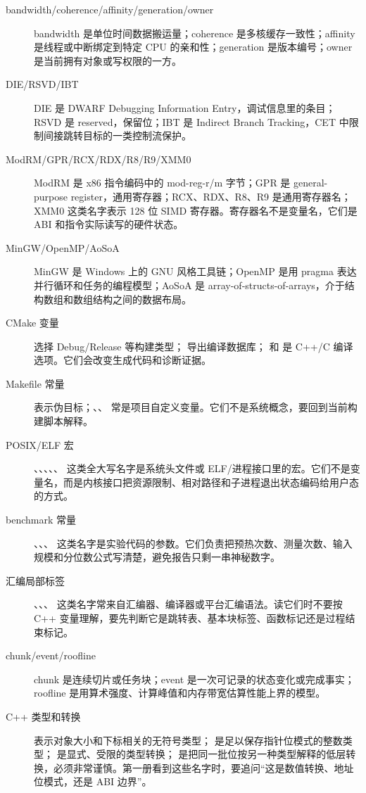 \begin{description}
  \item[bandwidth/coherence/affinity/generation/owner] bandwidth 是单位时间数据搬运量；coherence 是多核缓存一致性；affinity 是线程或中断绑定到特定 CPU 的亲和性；generation 是版本编号；owner 是当前拥有对象或写权限的一方。
  \item[DIE/RSVD/IBT] DIE 是 DWARF Debugging Information Entry，调试信息里的条目；RSVD 是 reserved，保留位；IBT 是 Indirect Branch Tracking，CET 中限制间接跳转目标的一类控制流保护。
  \item[ModRM/GPR/RCX/RDX/R8/R9/XMM0] ModRM 是 x86 指令编码中的 mod-reg-r/m 字节；GPR 是 general-purpose register，通用寄存器；RCX、RDX、R8、R9 是通用寄存器名；XMM0 这类名字表示 128 位 SIMD 寄存器。寄存器名不是变量名，它们是 ABI 和指令实际读写的硬件状态。
  \item[MinGW/OpenMP/AoSoA] MinGW 是 Windows 上的 GNU 风格工具链；OpenMP 是用 pragma 表达并行循环和任务的编程模型；AoSoA 是 array-of-structs-of-arrays，介于结构数组和数组结构之间的数据布局。
  \item[CMake 变量]  选择 Debug/Release 等构建类型； 导出编译数据库； 和  是 C++/C 编译选项。它们会改变生成代码和诊断证据。
  \item[Makefile 常量]  表示伪目标；、、 常是项目自定义变量。它们不是系统概念，要回到当前构建脚本解释。
  \item[POSIX/ELF 宏] 、、、、、 这类全大写名字是系统头文件或 ELF/进程接口里的宏。它们不是变量名，而是内核接口把资源限制、相对路径和子进程退出状态编码给用户态的方式。
  \item[benchmark 常量] 、、、 这类名字是实验代码的参数。它们负责把预热次数、测量次数、输入规模和分位数公式写清楚，避免报告只剩一串神秘数字。
  \item[汇编局部标签] 、、、 这类名字常来自汇编器、编译器或平台汇编语法。读它们时不要按 C++ 变量理解，要先判断它是跳转表、基本块标签、函数标记还是过程结束标记。
  \item[chunk/event/roofline] chunk 是连续切片或任务块；event 是一次可记录的状态变化或完成事实；roofline 是用算术强度、计算峰值和内存带宽估算性能上界的模型。
  \item[C++ 类型和转换]  表示对象大小和下标相关的无符号类型； 是足以保存指针位模式的整数类型； 是显式、受限的类型转换； 是把同一批位按另一种类型解释的低层转换，必须非常谨慎。第一册看到这些名字时，要追问“这是数值转换、地址位模式，还是 ABI 边界”。

\end{description}
